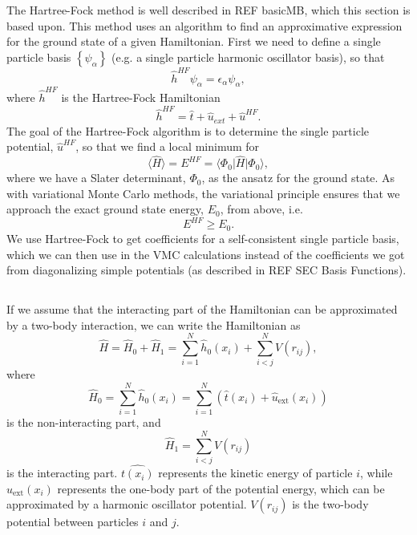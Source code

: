 \documentclass[../main.tex]{subfiles}
\begin{document}
The Hartree-Fock method is well described in REF basicMB, which this section is based upon. This method uses an algorithm to find an approximative expression for the ground state of a given Hamiltonian. First we need to define a single particle basis $\left\{\psi_\alpha\right\}$ (e.g. a single particle harmonic oscillator basis), so that 
\begin{equation}
    \hat{h}^{HF}\psi_\alpha = \epsilon_\alpha \psi_\alpha,
\end{equation}
where $\hat{h}^{HF}$ is the Hartree-Fock Hamiltonian
\begin{equation}
    \hat{h}^{HF} = \hat{t} + \hat{u}_{ext} + \hat{u}^{HF}.
\end{equation}
The goal of the Hartree-Fock algorithm is to determine the single particle potential, $\hat{u}^{HF}$, so that we find a local minimum for
\begin{equation}
    \langle \hat{H} \rangle = E^{HF} = \langle \Phi_0 \vert \hat{H} \vert \Phi_0 \rangle,
\end{equation}
where we have a Slater determinant, $\Phi_0$, as the ansatz for the ground state. As with variational Monte Carlo methods, the variational principle ensures that we approach the exact ground state energy, $E_0$, from above, i.e.
\begin{equation}
    E^{HF} \geq E_0.
\end{equation}
We use Hartree-Fock to get coefficients for a self-consistent single particle basis, which we can then use in the VMC calculations instead of the coefficients we got from diagonalizing simple potentials (as described in REF SEC Basis Functions).

\subsection{}

If we assume that the interacting part of the Hamiltonian can be approximated by a two-body interaction, we can write the Hamiltonian as
\begin{equation}
    \hat{H} = \hat{H}_0 + \hat{H}_1 = \sum_{i=1}^N \hat{h}_0(x_i) + \sum_{i<j}^N V(r_{ij}),
\end{equation}
where
\begin{equation}
    \hat{H}_0 = \sum_{i=1}^N \hat{h}_0(x_i) = \sum_{i=1}^N \left( \hat{t}(x_i) + \hat{u}_{\textrm{ext}}(x_i) \right)
\end{equation}
is the non-interacting part, and
\begin{equation}
    \hat{H}_1 = \sum_{i<j}^N V(r_{ij})
\end{equation}
is the interacting part. $\hat{t(x_i)}$ represents the kinetic energy of particle $i$, while $\hat{u}_{\textrm{ext}}(x_i)$ represents the one-body part of the potential energy, which can be approximated by a harmonic oscillator potential. $V(r_{ij})$ is the two-body potential between particles $i$ and $j$.
\end{document}
